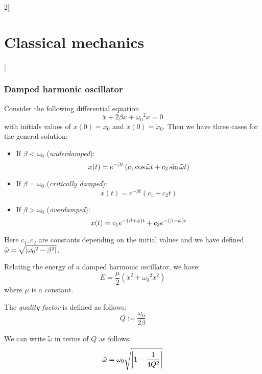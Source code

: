 \documentclass[../../../main.tex]{subfiles}
\begin{document}
\begin{multicols}{2}[\section{Classical mechanics}]
  \subsubsection{Damped harmonic oscillator}
  \begin{proposition}
    Consider the following differential equation $$\ddot{x}+2\beta\dot{x}+{\omega_0}^2 x=0$$ with initials values of $x(0)=x_0$ and $\dot{x}(0)=\dot{x}_0$. Then we have three cases for the general solution:
    \begin{itemize}
      \item If $\beta<\omega_0$ (\emph{underdamped}):
            \begin{equation}
              x(t)=e^{-\beta t}\left(c_1\cos\Tilde{\omega}t+c_2\sin\Tilde{\omega}t\right)
              \label{CM_b<w}
            \end{equation}
      \item If $\beta=\omega_0$ (\emph{critically damped}):
            \begin{equation}
              x(t)=e^{-\beta t}\left(c_1+c_2t\right)
              \label{CM_b=w}
            \end{equation}
      \item If $\beta>\omega_0$ (\emph{overdamped}):
            \begin{equation}
              x(t)=c_1e^{-(\beta+\Tilde{\omega})t}+c_2e^{-(\beta-\Tilde{\omega})t}
              \label{CM_b>w}
            \end{equation}
    \end{itemize}
    Here $c_1,c_2$ are constants depending on the initial values and we have defined $\displaystyle \Tilde{\omega}=\sqrt{\left|{\omega_0}^2-\beta^2\right|}$.
  \end{proposition}
  \begin{proposition}
    Relating the energy of a damped harmonic oscillator, we have:
    $$E=\frac{\mu}{2}\left(\dot{x}^2+{\omega_0}^2x^2\right)$$ where $\mu$ is a constant.
  \end{proposition}
  \begin{definition}
    The \emph{quality factor} is defined as follows: $$Q:=\frac{\omega_0}{2\beta}$$
  \end{definition}
  \begin{proposition}
    We can write $\tilde{\omega}$ in terms of $Q$ as follows: $$\Tilde{\omega}=\omega_0\sqrt{\left|1-\frac{1}{4Q^2}\right|}$$
  \end{proposition}

\end{multicols}
\end{document}
